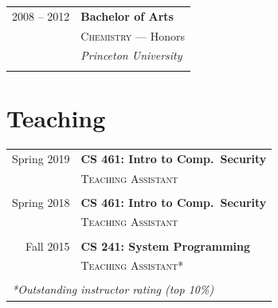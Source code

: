 \documentclass[10pt]{article} %
\begin{document}
{\begin{minipage}[t]{0.44\textwidth}
\begin{tabular}{rl}

2008 -- 2012 & \textbf{Bachelor of Arts} \\ 
& \textsc{Chemistry} --- \small{Honors} \\ 
& \textit{Princeton University}\\
&\\
	  
\end{tabular}


\section{Teaching} 

\begin{tabular}{rl}

Spring 2019	 & \textbf{CS 461: Intro to Comp.\ Security}\\
& \textsc{Teaching Assistant}\\ \\
 

Spring 2018	 & \textbf{CS 461: Intro to Comp.\ Security}\\
& \textsc{Teaching Assistant}\\ \\
 

Fall 2015	 & \textbf{CS 241: System Programming}\\
& \textsc{Teaching Assistant*}\\ \\



\multicolumn{2}{l}{\textit{*Outstanding instructor rating (top 10\%)}}
\end{tabular}\\[10pt]



\end{minipage}}
\end{document}
